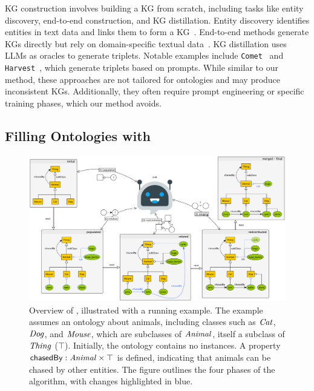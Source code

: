 \Gls{KG} construction involves building a \gls{KG} from scratch, including tasks like entity discovery, end-to-end construction, and KG distillation.
%
Entity discovery identifies entities in text data and links them to form a \gls{KG}~\cite{entity-discovery-ayoola-2022,entity-discovery-decao-2021}.
%
End-to-end methods generate \glspl{KG} directly but rely on domain-specific textual data~\cite{end-to-end-kg-kumar-2020,end-tp-end-kg-melnyk-2021,end-to-end-kg-han-2023}.
%
\Gls{KG} distillation uses \glspl{LLM} as oracles to generate triplets.
%
Notable examples include \texttt{Comet}~\cite{comet-2019} and \texttt{Harvest}~\cite{HaoTTNSZXH23}, which generate triplets based on prompts.
%
While similar to our method, these approaches are not tailored for ontologies and may produce inconsistent \glspl{KG}.
%
Additionally, they often require prompt engineering or specific training phases, which our method avoids.


\subsection{Filling Ontologies with \llmfkg}
\label{subsec:filling-ontologies-kgfiller}
%
\begin{figure}
    \centering
    \includegraphics[width=\linewidth]{figures/kgfiller/roadmap}
    \caption[Overview of \llmfkg{}]{%
        Overview of \llmfkg{}, illustrated with a running example.
        The example assumes an ontology about animals, including classes such as $\concept{Cat}$, $\concept{Dog}$, and $\concept{Mouse}$, which are subclasses of $\concept{Animal}$, itself a subclass of $\concept{Thing}$ (\(\top\)).
        Initially, the ontology contains no instances.
        A property $\relation{chasedBy} : \concept{Animal} \times \top$ is defined, indicating that animals can be chased by other entities.
        The figure outlines the four phases of the \llmfkg{} algorithm, with changes highlighted in blue.
    }
    \label{fig:roadmap}
\end{figure}

